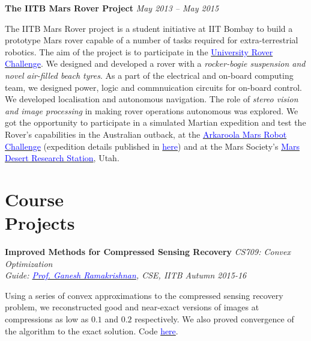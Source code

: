 \documentclass[margin,line]{res}
\newenvironment{list1}{
  \begin{list}{\ding{113}}{%
      \setlength{\itemsep}{0in}
      \setlength{\parsep}{0in} \setlength{\parskip}{0in}
      \setlength{\topsep}{0in} \setlength{\partopsep}{0in} 
      \setlength{\leftmargin}{0.17in}}}{\end{list}}
\begin{document}
\begin{resume}
{\bf The IITB Mars Rover Project}
\hfill {\it May 2013 -- May 2015} \\
\vspace*{-.13in}
\begin{list1}
\item[]
The IITB Mars Rover project is a student initiative at IIT Bombay to build a prototype Mars rover capable of a number of tasks required for extra-terrestrial robotics. The aim of the project is to participate in the \href{http://urc.marssociety.org/}{\textcolor{blue} {University Rover Challenge}}. We designed and developed a rover with a \textit{rocker-bogie suspension and novel air-filled beach tyres}. As a part of the electrical and on-board computing team, we designed power, logic and commnuication circuits for on-board control. We developed localisation and autonomous navigation. The role of \textit{stereo vision and image processing} in making rover operations autonomous was explored. We got the opportunity to participate in a simulated Martian expedition and test the Rover's capabilities in the Australian outback, at the \href{http://marssociety.org.au/article/arkaroola-mars-robot-challenge-spaceward-bound-expedition}{\textcolor{blue} {Arkaroola Mars Robot Challenge}} (expedition details published in \href{http://www.nssa.com.au/14asrc/14ASRC-proceedings.zip}{\textcolor{blue} {here}}) and at the Mars Society's \href{http://mdrs.marssociety.org/}{\textcolor{blue} {Mars Desert Research Station}}, Utah.
\end{list1}

\section{\sc Course \\Projects}
{\bf Improved Methods for Compressed Sensing Recovery} \hfill {\it CS709: Convex Optimization} \\
{\em Guide: \href{https://www.cse.iitb.ac.in/~ganesh/}{\textcolor{blue}{Prof. Ganesh Ramakrishnan}}, CSE, IITB \hfill Autumn 2015-16} \\
\vspace*{-.15in}
\begin{list1}
\item[] Using a series of convex approximations to the compressed sensing recovery problem, we reconstructed good and near-exact versions of images at compressions as low as $0.1$ and $0.2$ respectively. We also proved convergence of the algorithm to the exact solution. Code \href{https://github.com/alankarkotwal/cs-rank-minimization}{\textcolor{blue} {here}}.
\end{list1}


\end{resume}
\end{document}
